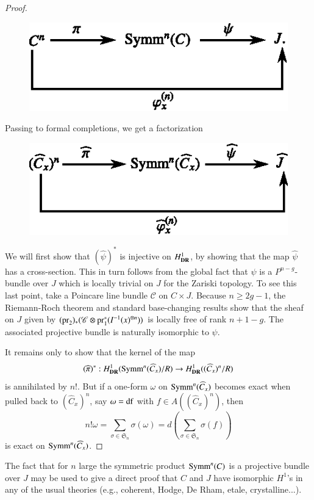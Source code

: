 \begin{proof}
\begin{figure}[H]
\centering
\includegraphics{chap6/fig12.eps}
\end{figure}
Passing to formal completions, we get a factorization
\begin{figure}[H]
\centering
\includegraphics{chap6/fig13.eps}
\end{figure}

We will first show that $(\widehat{\psi})^{*}$ is injective on $H^{1}_{\mathbf{DR}}$, by showing that the map $\widehat{\psi}$ has a cross-section. This in turn follows from the global fact that $\psi$ is a $P^{n-g}$-bundle over $J$ which is locally trivial on $J$ for the Zariski topology. To see this last point, take a Poincare line bundle $\mathscr{C}$ on $C\times J$. Because $n\geq 2g-1$, the Riemann-Roch theorem and standard base-changing results show that the sheaf on $J$ given by $(\operatorname{pr}_{2})_{*}(\mathscr{C}\otimes\operatorname{pr}^{*}_{1}(I^{-1}(x)^{\otimes n}))$ is locally free of rank $n+1-g$. The associated projective bundle is naturally isomorphic to $\psi$.

It remains only to show that the kernel of the map
$$
(\widehat{\pi})^{*}:H^{1}_{\mathbf{DR}}(\operatorname{Symm}^{n}(\widehat{C}_{x})/R)\to H^{1}_{\mathbf{DR}}((\widehat{C}_{x})^{n}/R)
$$
is annihilated by $n!$. But if a one-form $\omega$ on $\operatorname{Symm}^{n}(\widehat{C}_{x})$ becomes exact when pulled back to $(\widehat{C}_{x})^{n}$, say $\omega=\operatorname{df}$ with $f\in A((\widehat{C}_{x})^{n})$, then 
$$
n!\omega=\sum\limits_{\sigma\in \mathfrak{S}_{n}}\sigma(\omega)=d\left(\sum\limits_{\sigma\in\mathfrak{S}_{n}}\sigma(f)\right)
$$
is exact on $\operatorname{Symm}^{n}(\widehat{C}_{x})$.
\end{proof}

\begin{remark*}
The fact that for $n$ large the symmetric product $\operatorname{Symm}^{n}(C)$ is a projective bundle over $J$ may be used to give a direct proof that $C$ and $J$ have isomorphic $H^{1}$'s in any of the usual theories (e.g., coherent, Hodge, De Rham, etale, crystalline...).
\end{remark*}

